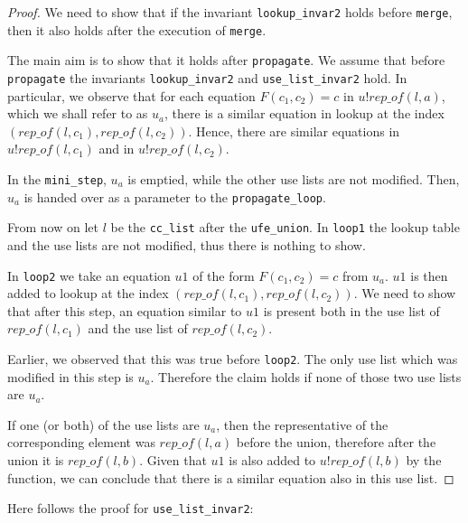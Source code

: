 \begin{proof}
We need to show that if the invariant \lstinline{lookup_invar2} holds before \lstinline{merge}, then it also holds after the execution of \lstinline|merge|.

The main aim is to show that it holds after \lstinline{propagate}.
We assume that before \lstinline{propagate} the invariants \lstinline{lookup_invar2} and \lstinline{use_list_invar2} hold.
In particular, we observe that for each equation $F(c_1, c_2) = c$ in $u ! rep\_of(l, a)$, which we shall refer to as $u_a$, there is a similar equation in lookup at the index $(rep\_of(l, c_1), rep\_of(l, c_2))$.
Hence, there are similar equations in $u ! rep\_of(l, c_1)$ and in $u ! rep\_of(l, c_2)$.

In the \lstinline{mini_step}, $u_a$ is emptied, while the other use lists are not modified. Then, $u_a$ is handed over as a parameter to the \lstinline{propagate_loop}.

From now on let $l$ be the \lstinline{cc_list} after the \lstinline{ufe_union}.
In \lstinline{loop1} the lookup table and the use lists are not modified, thus there is nothing to show.

In \lstinline{loop2} we take an equation $u1$ of the form $F(c_1, c_2) = c$ from $u_a$.
$u1$ is then added to lookup at the index $(rep\_of(l, c_1), rep\_of(l, c_2))$. We need to show that after this step, an equation similar to $u1$ is present both in the use list of $rep\_of(l, c_1)$ and the use list of $rep\_of(l, c_2)$.

Earlier, we observed that this was true before \lstinline{loop2}. The only use list which was modified in this step is $u_a$. Therefore the claim holds if none of those two use lists are $u_a$.

If one (or both) of the use lists are $u_a$, then the representative of the corresponding element was $rep\_of(l,a)$ before the union, therefore after the union it is $rep\_of(l,b)$. Given that $u1$ is also added to $u ! rep\_of(l, b)$ by the function, we can conclude that there is a similar equation also in this use list.
\end{proof}

Here follows the proof for \lstinline{use_list_invar2}:

